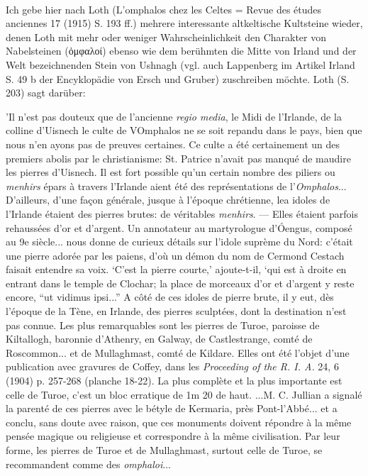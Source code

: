 \documentclass[a4paper, 11pt, oneside]{article}
\begin{document}
\paragraph{}
Ich gebe hier nach Loth (L'omphalos chez les Celtes = Revue des études anciennes 17 (1915) S. 193 ff.) mehrere interessante altkeltische Kultsteine wieder, denen Loth mit mehr oder weniger Wahrscheinlichkeit den Charakter von Nabelsteinen (ὀμφαλοί) ebenso wie dem berühmten die Mitte von Irland und der Welt bezeichnenden Stein von Ushnagh (vgl. auch Lappenberg im Artikel Irland S. 49 b der Encyklopädie von Ersch und Gruber) zuschreiben möchte. Loth (S. 203) sagt darüber:

'Il n'est pas douteux que de l'ancienne \emph{regio media}, le Midi de l'Irlande, de la colline d'Uisnech le culte de VOmphalos ne se soit repandu dans le pays, bien que nous n'en ayons pas de preuves certaines. Ce culte a été certainement un des premiers abolis par le christianisme: St. Patrice n'avait pas manqué de maudire les pierres d'Uisnech. Il est fort possible qu'un certain nombre des piliers ou \emph{menhirs} épars à travers l'Irlande aient été des représentations de l'\emph{Omphalos}... D'ailleurs, d'une façon générale, jusque à l'époque chrétienne, lea idoles de l'Irlande étaient des pierres brutes: de véritables \emph{menhirs}. --- Elles étaient parfois rehaussées d'or et d'argent. Un annotateur au martyrologue d'Óengus, composé au 9e siècle... nous donne de curieux détails sur l'idole suprème du Nord: c'était une pierre adorée par les paiens, d'où un démon du nom de Cermond Cestach faisait entendre sa voix. `C'est la pierre courte,' ajoute-t-il, `qui est à droite en entrant dans le temple de Clochar; la place de morceaux d'or et d'argent y reste encore, "`ut vidimus ipsi..."' A côté de ces idoles de pierre brute, il y eut, dès l'époque de la Tène, en Irlande, des pierres sculptées, dont la destination n'est pas connue. Les plus remarquables sont les pierres de Turoe, paroisse de Kiltallogh, baronnie d'Athenry, en Galway, de Castlestrange, comté de Roscommon... et de Mullaghmast, comté de Kildare. Elles ont été l'objet d'une publication avec gravures de Coffey, dans les \emph{Proceeding of the R. I. A.} 24, 6 (1904) p. 257-268 (planche 18-22). La plus complète et la plus importante est celle de Turoe, c'est un bloc erratique de 1m 20 de haut. ...M. C. Jullian a signalé la parenté de ces pierres avec le bétyle de Kermaria, près Pont-l'Abbé... et a conclu, sans doute avec raison, que ces monuments doivent répondre à la même pensée magique ou religieuse et correspondre à la même civilisation. Par leur forme, les pierres de Turoe et de Mullaghmast, surtout celle de Turoe, se recommandent comme des \emph{omphaloi}...
\end{document}
